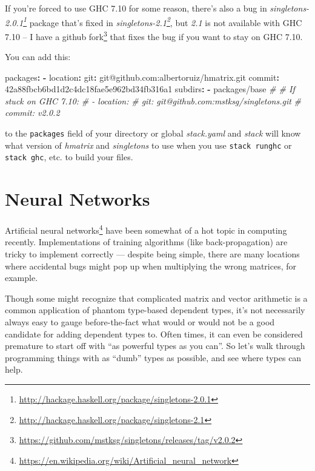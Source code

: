 \documentclass[]{article}
\newenvironment{Shaded}{}{}
\newcommand{\AttributeTok}[1]{\textcolor[rgb]{0.49,0.56,0.16}{#1}}
\newcommand{\CommentTok}[1]{\textcolor[rgb]{0.38,0.63,0.69}{\textit{#1}}}
\newcommand{\FunctionTok}[1]{\textcolor[rgb]{0.02,0.16,0.49}{#1}}
\newcommand{\KeywordTok}[1]{\textcolor[rgb]{0.00,0.44,0.13}{\textbf{#1}}}
\renewcommand{\href}[2]{#2\footnote{\url{#1}}}
\begin{document}
If you're forced to use GHC 7.10 for some reason, there's also a bug in
\emph{\href{http://hackage.haskell.org/package/singletons-2.0.1}{singletons-2.0.1}}
package that's fixed in
\emph{\href{http://hackage.haskell.org/package/singletons-2.1}{singletons-2.1}},
but \emph{2.1} is not available with GHC 7.10 -- I have a
\href{https://github.com/mstksg/singletons/releases/tag/v2.0.2}{github fork}
that fixes the bug if you want to stay on GHC 7.10.

You can add this:

\begin{Shaded}
\begin{Highlighting}[]
\FunctionTok{packages}\KeywordTok{:}
\KeywordTok{{-}}\AttributeTok{ }\FunctionTok{location}\KeywordTok{:}
\AttributeTok{    }\FunctionTok{git}\KeywordTok{:}\AttributeTok{ git@github.com:albertoruiz/hmatrix.git}
\AttributeTok{    }\FunctionTok{commit}\KeywordTok{:}\AttributeTok{ 42a88fbcb6bd1d2c4dc18fae5e962bd34fb316a1}
\AttributeTok{  }\FunctionTok{subdirs}\KeywordTok{:}
\AttributeTok{    }\KeywordTok{{-}}\AttributeTok{ packages/base}
\CommentTok{\# \# If stuck on GHC 7.10:}
\CommentTok{\# {-} location:}
\CommentTok{\#     git: git@github.com:mstksg/singletons.git}
\CommentTok{\#     commit: v2.0.2}
\end{Highlighting}
\end{Shaded}

to the \texttt{packages} field of your directory or global \emph{stack.yaml} and
\emph{stack} will know what version of \emph{hmatrix} and \emph{singletons} to
use when you use \texttt{stack\ runghc} or \texttt{stack\ ghc}, etc. to build
your files.

\hypertarget{neural-networks}{%
\section{Neural Networks}\label{neural-networks}}

\href{https://en.wikipedia.org/wiki/Artificial_neural_network}{Artificial neural
networks} have been somewhat of a hot topic in computing recently.
Implementations of training algorithms (like back-propagation) are tricky to
implement correctly --- despite being simple, there are many locations where
accidental bugs might pop up when multiplying the wrong matrices, for example.

Though some might recognize that complicated matrix and vector arithmetic is a
common application of phantom type-based dependent types, it's not necessarily
always easy to gauge before-the-fact what would or would not be a good candidate
for adding dependent types to. Often times, it can even be considered premature
to start off with ``as powerful types as you can''. So let's walk through
programming things with as ``dumb'' types as possible, and see where types can
help.
\end{document}
